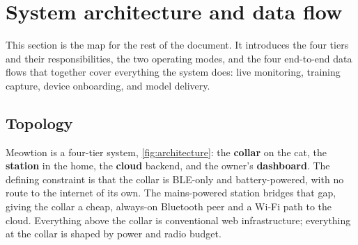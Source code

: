 \section{System architecture and data flow}
\label{sec:architecture}

This section is the map for the rest of the document. It introduces the four tiers and their
responsibilities, the two operating modes, and the four end-to-end data flows that together cover
everything the system does: live monitoring, training capture, device onboarding, and model delivery.

\subsection{Topology}

Meowtion is a four-tier system, \cref{fig:architecture}: the \textbf{collar} on the cat, the
\textbf{station} in the home, the \textbf{cloud} backend, and the owner's \textbf{dashboard}. The
defining constraint is that the collar is BLE-only and battery-powered, with no route to the internet
of its own. The mains-powered station bridges that gap, giving the collar a cheap, always-on
Bluetooth peer and a Wi-Fi path to the cloud. Everything above the collar is conventional web
infrastructure; everything at the collar is shaped by power and radio budget.


